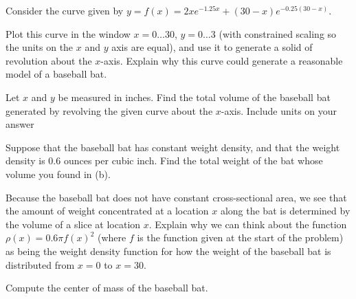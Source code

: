 \begin{exercises}
  \item Consider the curve given by $y = f(x) = 2xe^{-1.25x} + (30-x) e^{-0.25(30-x)}$.
  \ba
  	\item Plot this curve in the window $x = 0 \ldots 30$, $y = 0 \ldots 3$ (with constrained scaling so the units on the $x$ and $y$ axis are equal), and use it to generate a solid of revolution about the $x$-axis.  Explain why this curve could generate a reasonable model of a baseball bat.
	\item Let $x$ and $y$ be measured in inches.  Find the total volume of the baseball bat generated by revolving the given curve about the $x$-axis.  Include units on your answer
	\item Suppose that the baseball bat has constant weight density, and that the weight density is 0.6 ounces per cubic inch.  Find the total weight of the bat whose volume you found in (b).
	\item Because the baseball bat does not have constant cross-sectional area, we see that the amount of weight concentrated at a location $x$ along the bat is determined by the volume of a slice at location $x$.  Explain why we can think about the function $\rho(x) = 0.6 \pi f(x)^2$ (where $f$ is the function given at the start of the problem) as being the weight density function for how the weight of the baseball bat is distributed from $x = 0$ to $x = 30$.
	\item Compute the center of mass of the baseball bat.  
  \ea
  
\end{exercises}
\afterexercises
